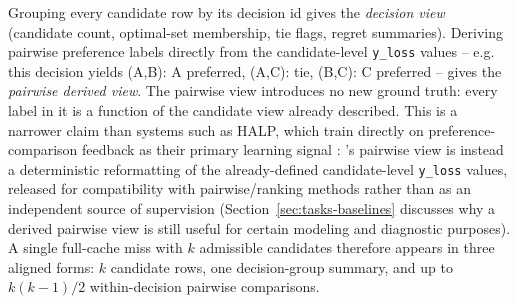 Grouping every candidate row by its decision id gives the \emph{decision
view} (candidate count, optimal-set membership, tie flags, regret
summaries). Deriving pairwise preference labels directly from the
candidate-level \texttt{y\_loss} values -- e.g. this decision yields
(A,B): A preferred, (A,C): tie, (B,C): C preferred -- gives the
\emph{pairwise derived view}. The pairwise view introduces no new ground
truth: every label in it is a function of the candidate view already
described. This is a narrower claim than systems such as HALP, which train
directly on preference-comparison feedback as their primary learning
signal \cite{song2023halp}: \lafc's pairwise view is instead a
deterministic reformatting of the already-defined candidate-level
\texttt{y\_loss} values, released for compatibility with pairwise/ranking
methods rather than as an independent source of supervision
(Section~\ref{sec:tasks-baselines} discusses why a derived
pairwise view is still useful for certain modeling and diagnostic
purposes). A single full-cache miss with $k$ admissible candidates
therefore appears in three aligned forms: $k$ candidate rows, one
decision-group summary, and up to $k(k-1)/2$ within-decision pairwise
comparisons.
